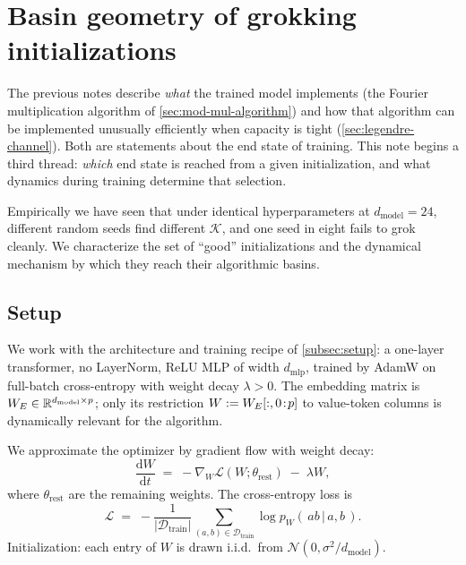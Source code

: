 \section{Basin geometry of grokking initializations}
\label{sec:basin-geometry}

The previous notes describe \emph{what} the trained model implements (the
Fourier multiplication algorithm of \cref{sec:mod-mul-algorithm}) and how that
algorithm can be implemented unusually efficiently when capacity is tight
(\cref{sec:legendre-channel}).  Both are statements about the end state of
training.  This note begins a third thread: \emph{which} end state is reached
from a given initialization, and what dynamics during training determine that
selection.

Empirically we have seen that under identical hyperparameters at
$d_{\text{model}} = 24$, different random seeds find different $\mathcal K$,
and one seed in eight fails to grok cleanly.  We characterize the set of
``good'' initializations and the dynamical mechanism by which they reach
their algorithmic basins.

\subsection{Setup}
\label{subsec:bgeo-setup}

We work with the architecture and training recipe of \cref{subsec:setup}: a
one-layer transformer, no LayerNorm, ReLU MLP of width $d_{\text{mlp}}$,
trained by AdamW on full-batch cross-entropy with weight decay $\lambda > 0$.
The embedding matrix is $W_E \in \mathbb{R}^{d_{\text{model}} \times p}$; only its
restriction $W := W_E[:, 0\!:\!p]$ to value-token columns is dynamically
relevant for the algorithm.

We approximate the optimizer by gradient flow with weight decay:
\begin{equation}
  \frac{\mathrm dW}{\mathrm d t} \;=\; -\nabla_W \mathcal L(W; \theta_{\text{rest}}) \;-\; \lambda W,
  \label{eq:bgeo-gradflow}
\end{equation}
where $\theta_{\text{rest}}$ are the remaining weights.  The cross-entropy loss is
\begin{equation}
  \mathcal L \;=\; -\frac{1}{|\mathcal D_{\text{train}}|}
    \sum_{(a, b) \in \mathcal D_{\text{train}}}
    \log p_W(\,ab \,\big|\, a, b\,).
  \label{eq:bgeo-loss}
\end{equation}
Initialization: each entry of $W$ is drawn i.i.d.\ from
$\mathcal N(0, \sigma^2 / d_{\text{model}})$.

